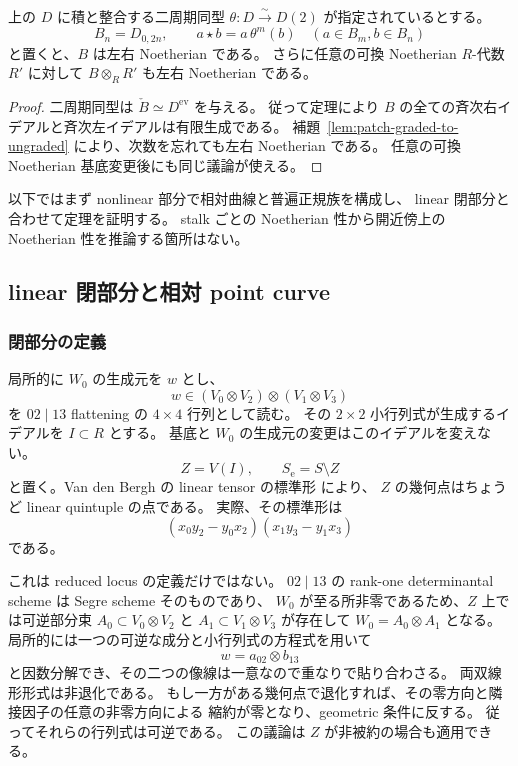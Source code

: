 \begin{corollary}[二周期の偶数環]
\label{cor:relative-periodic-even-noetherian}
上の $D$ に積と整合する二周期同型 $\theta:D\xrightarrow{\sim}D(2)$ が指定されているとする。
\begin{equation}\label{noeth-eq:even-ring}
 B_n=D_{0,2n},\qquad
 a\star b=a\,\theta^m(b)\quad(a\in B_m, b\in B_n)
\end{equation}
と置くと、$B$ は左右 Noetherian である。
さらに任意の可換 Noetherian $R$-代数 $R'$ に対して
$B\otimes_RR'$ も左右 Noetherian である。
\end{corollary}

\begin{proof}
二周期同型は $\check B\simeq D^{\mathrm{ev}}$ を与える。
従って定理により $B$ の全ての斉次右イデアルと斉次左イデアルは有限生成である。
補題~\ref{lem:patch-graded-to-ungraded} により、次数を忘れても左右 Noetherian である。
任意の可換 Noetherian 基底変更後にも同じ議論が使える。
\end{proof}

以下ではまず nonlinear 部分で相対曲線と普遍正規族を構成し、
linear 閉部分と合わせて定理を証明する。
stalk ごとの Noetherian 性から開近傍上の Noetherian 性を推論する箇所はない。

\subsection{linear 閉部分と相対 point curve}

\subsubsection{閉部分の定義}

局所的に $W_0$ の生成元を $w$ とし、
\[
 w\in (V_0\otimes V_2)\otimes(V_1\otimes V_3)
\]
を $02\mid13$ flattening の $4\times4$ 行列として読む。
その $2\times2$ 小行列式が生成するイデアルを $I\subset R$ とする。
基底と $W_0$ の生成元の変更はこのイデアルを変えない。
\[
 Z=V(I),\qquad S_{\mathrm e}=S\setminus Z
\]
と置く。Van den Bergh の linear tensor の標準形
\cite[Lemma 5.2.4, (5.3)]{VdB2011} により、
$Z$ の幾何点はちょうど linear quintuple の点である。
実際、その標準形は
\[
 (x_0y_2-y_0x_2)(x_1y_3-y_1x_3)
\]
である。

これは reduced locus の定義だけではない。
$02\mid13$ の rank-one determinantal scheme は Segre scheme そのものであり、
$W_0$ が至る所非零であるため、$Z$ 上では可逆部分束
$A_0\subset V_0\otimes V_2$ と $A_1\subset V_1\otimes V_3$ が存在して
$W_0=A_0\otimes A_1$ となる。
局所的には一つの可逆な成分と小行列式の方程式を用いて
\begin{equation}\label{noeth-eq:linear-factorization}
 w=a_{02}\otimes b_{13}
\end{equation}
と因数分解でき、その二つの像線は一意なので重なりで貼り合わさる。
両双線形形式は非退化である。
もし一方がある幾何点で退化すれば、その零方向と隣接因子の任意の非零方向による
縮約が零となり、geometric 条件に反する。
従ってそれらの行列式は可逆である。
この議論は $Z$ が非被約の場合も適用できる。

